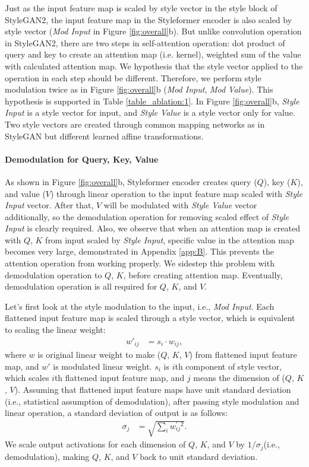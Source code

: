 \documentclass[10pt,twocolumn,letterpaper]{article}
\begin{document}
Just as the input feature map is scaled by style vector in the style block of StyleGAN2, the input feature map in the Styleformer encoder is also scaled by style vector (\textit{Mod Input} in Figure \ref{fig:overall}b).
But unlike convolution operation in StyleGAN2, there are two steps in self-attention operation: dot product of query and key to create an attention map (i.e. kernel), weighted sum of the value with calculated attention map.
We hypothesis that the style vector applied to the operation in each step should be different. 
Therefore, we perform style modulation twice as in Figure \ref{fig:overall}b (\textit{Mod Input}, \textit{Mod Value}). This hypothesis is supported in Table \ref{table_ablation:1}. 
In Figure \ref{fig:overall}b,  \textit{Style Input} is a style vector for input, and \textit{Style Value} is a style vector only for value. Two style vectors are created through common mapping networks as in StyleGAN but different learned affine transformations. 

\paragraph{Demodulation for Query, Key, Value} 
As shown in Figure \ref{fig:overall}b, Styleformer encoder creates query ($Q$), key ($K$), and value ($V$) through linear operation to the input feature map scaled with \textit{Style Input} vector. After that, $V$ will be modulated with \textit{Style Value} vector additionally, so the demodulation operation for removing scaled effect of \textit{Style Input} is clearly required. Also, we observe that when an attention map is created with $Q$, $K$ from input scaled by \textit{Style Input}, specific value in the attention map becomes very large, demonstrated in Appendix \ref{app:B}. This prevents the attention operation from working properly. We sidestep this problem with demodulation operation to $Q$, $K$, before creating attention map. Eventually, demodulation operation is all required for $Q$, $K$, and $V$.

Let's first look at the style modulation to the input, i.e., \textit{Mod Input}. Each flattened input feature map is scaled through a style vector, which is equivalent to scaling the linear weight:
\begin{align}
    \label{eq:5}
    w'_{ij} &= s_i \cdot w_{ij},
\end{align}
where $w$ is original linear weight to make ($Q$, $K$, $V$) from flattened input feature map, and $w'$ is modulated linear weight. $s_{i}$ is $i$th component of style vector, which scales $i$th flattened input feature map, and $j$ means the dimension of ($Q$, $K$, $V$). Assuming that flattened input feature maps have unit standard deviation (i.e., statistical assumption of demodulation), after passing style modulation and linear operation, a standard deviation of output is as follows:
\begin{align}
    \label{eq:6}
    \sigma_{j} &= \sqrt{\sum_{i}{w^{'}_{ij}{^{2}}}}.
\end{align}
We scale output activations for each dimension of $Q$, $K$, and $V$ by $1/\sigma_{j}$(i.e., demodulation), making $Q$, $K$, and $V$ back to unit standard deviation. 
\end{document}
